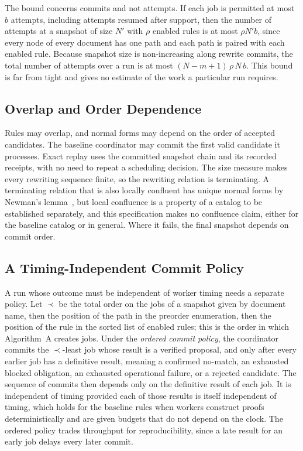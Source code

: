 \documentclass[11pt,a4paper]{article}
\theoremstyle{plain}
\theoremstyle{definition}
\theoremstyle{remark}
\theoremstyle{definition}
\begin{document}
The bound concerns commits and not attempts. If each job is permitted at most $b$ attempts, including attempts resumed after support, then the number of attempts at a snapshot of size $N'$ with $\rho$ enabled rules is at most $\rho N' b$, since every node of every document has one path and each path is paired with each enabled rule. Because snapshot size is non-increasing along rewrite commits, the total number of attempts over a run is at most $(N - m + 1)\,\rho\,N\,b$. This bound is far from tight and gives no estimate of the work a particular run requires.

\subsection{Overlap and Order Dependence}

Rules may overlap, and normal forms may depend on the order of accepted candidates. The baseline coordinator may commit the first valid candidate it processes. Exact replay uses the committed snapshot chain and its recorded receipts, with no need to repeat a scheduling decision. The size measure makes every rewriting sequence finite, so the rewriting relation is terminating. A terminating relation that is also locally confluent has unique normal forms by Newman's lemma~\cite{newman1942,baader1998}, but local confluence is a property of a catalog to be established separately, and this specification makes no confluence claim, either for the baseline catalog or in general. Where it fails, the final snapshot depends on commit order.

\subsection{A Timing-Independent Commit Policy}

A run whose outcome must be independent of worker timing needs a separate policy. Let $\prec$ be the total order on the jobs of a snapshot given by document name, then the position of the path in the preorder enumeration, then the position of the rule in the sorted list of enabled rules; this is the order in which Algorithm~A creates jobs. Under the \emph{ordered commit policy}, the coordinator commits the $\prec$-least job whose result is a verified proposal, and only after every earlier job has a definitive result, meaning a confirmed no-match, an exhausted blocked obligation, an exhausted operational failure, or a rejected candidate. The sequence of commits then depends only on the definitive result of each job. It is independent of timing provided each of those results is itself independent of timing, which holds for the baseline rules when workers construct proofs deterministically and are given budgets that do not depend on the clock. The ordered policy trades throughput for reproducibility, since a late result for an early job delays every later commit.
\end{document}
